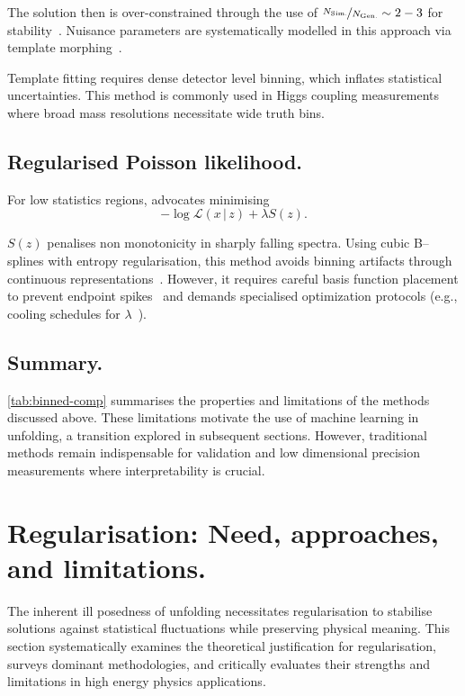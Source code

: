 The solution then is over-constrained through the use of \(\nicefrac{N_{\text{Sim.}}}{N_{\text{Gen.}}} \sim 2-3\) for stability~\cite{britzger_linear_2022}.
%
Nuisance parameters are systematically modelled in this approach via template morphing~\cite{baak_interpolation_2015}.

Template fitting requires dense detector level binning, which inflates statistical uncertainties.
%
This method is commonly used in Higgs coupling measurements where broad mass resolutions necessitate wide truth bins.

\subsection{Regularised Poisson likelihood.}  
For low statistics regions, \cite{gaponenko_practical_2020} advocates minimising
\begin{equation}
     -\log \mathcal{L}(x\,|\,z) + \lambda S(z).
\end{equation}  

\(S(z)\) penalises non monotonicity in sharply falling spectra.
%
Using cubic B--splines with entropy regularisation, this method avoids binning artifacts through continuous representations~\cite{gaponenko_practical_2020}.
%
However, it requires careful basis function placement to prevent endpoint spikes~\cite{fan_analysis_2022} and demands specialised optimization protocols (e.g., cooling schedules for \(\lambda\)~\cite{jia_sparse_2019}).

    \subsection{Summary.}  
        
        \cref{tab:binned-comp} summarises the properties and limitations of the methods discussed above.
        These limitations motivate the use of machine learning in unfolding, a transition explored in subsequent sections.
        However, traditional methods remain indispensable for validation and low dimensional precision measurements where interpretability is crucial.
        
\section{Regularisation: Need, approaches, and limitations.}
\sectionminitoc
    The inherent ill posedness of unfolding necessitates regularisation to stabilise solutions against statistical fluctuations while preserving physical meaning.
    This section systematically examines the theoretical justification for regularisation, surveys dominant methodologies, and critically evaluates their strengths and limitations in high energy physics applications.
        
